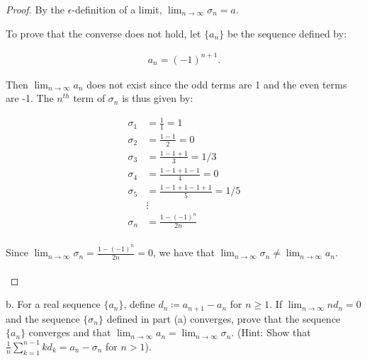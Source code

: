 \begin{proof}
        By the $\epsilon$-definition of a limit,
        $\lim_{n \rightarrow \infty}{\sigma_n} = a$.
        \pagebreak

        To prove that the converse does not hold, let $\{a_n\}$ be the
        sequence defined by:

        \begin{align*}
            a_n = (-1)^{n+1}.
        \end{align*}
        
        Then $\lim_{n \rightarrow \infty}{a_n}$ does not exist since the odd
        terms are 1 and the even terms are -1. The $n^{th}$ term of
        $\sigma_n$ is thus given by:

        \begin{align*}
            \sigma_1 &= \frac{1}{1} = 1 \\
            \sigma_2 &= \frac{1 - 1}{2} = 0 \\
            \sigma_3 &= \frac{1 - 1 + 1}{3} = 1/3 \\
            \sigma_4 &= \frac{1 - 1 + 1 - 1}{4} = 0 \\
            \sigma_5 &= \frac{1 - 1 + 1 - 1 + 1}{5} = 1/5 \\
                     &\vdots \\
            \sigma_n &= \frac{1 - (-1)^n}{2n} \\
        \end{align*}

        Since $\lim_{n \rightarrow \infty}{\sigma_n = \frac{1 - (-1)^n}{2n}} = 0$,
        we have that
        $\lim_{n \rightarrow \infty}{\sigma_n} \neq \lim_{n \rightarrow \infty}{a_n}$.
        \\\\
    \end{proof}
    \pagebreak

b.  For a real sequence $\{a_n\}$, define $d_n \coloneqq a_{n+1} - a_n$ for
    $n \ge 1$. If $\lim_{n \rightarrow \infty}{nd_n} = 0$ and the sequence
    $\{\sigma_n\}$ defined in part (a) converges, prove that the sequence
    $\{a_n\}$ converges and that
    $\lim_{n \rightarrow \infty}{a_n} = \lim_{n \rightarrow \infty}{\sigma_n}$.
    (Hint: Show that $\frac{1}{n}\sum\limits_{k=1}^{n-1}{kd_k} = a_n - \sigma_n$
     for $n > 1$).

